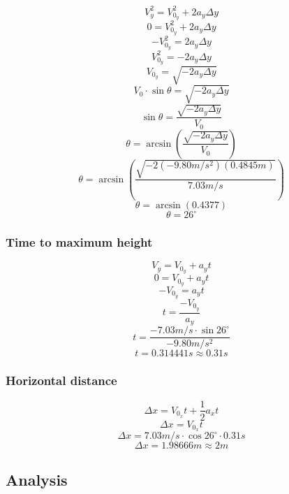\documentclass[11pt, letterpaper, includehead]{article}
\begin{document}
$$V_y^2 = V_{0_y}^2 + 2a_y\Delta y$$
$$0 = V_{0_y}^2 + 2a_y\Delta y$$
$$-V_{0_y}^2 = 2a_y\Delta y$$
$$V_{0_y}^2 = -2a_y\Delta y$$
$$V_{0_y} = \sqrt{-2a_y\Delta y}$$
$$V_0\cdot\sin\theta = \sqrt{-2a_y\Delta y}$$
$$\sin\theta = \frac{\sqrt{-2a_y\Delta y}}{V_0}$$
$$\theta = \arcsin\left(\frac{\sqrt{-2a_y\Delta y}}{V_0}\right)$$
$$\theta = \arcsin\left(\frac{\sqrt{-2(-9.80m/s^2)(0.4845m)}}{7.03m/s}\right)$$
$$\theta = \arcsin(0.4377)$$
$$\theta = 26^{\circ}$$
\subsubsection{Time to maximum height} %
$$V_y = V_{0_y} + a_yt$$
$$0 = V_{0_y} + a_yt$$
$$-V_{0_y} = a_yt$$
$$t = \frac{-V_{0_y}}{a_y}$$
$$t = \frac{-7.03m/s\cdot\sin26^{\circ}}{-9.80m/s^2}$$
$$t = 0.314441s \approx 0.31s$$
\subsubsection{Horizontal distance} %
$$\Delta x = V_{0_x}t + \frac{1}{2}a_xt$$
$$\Delta x = V_{0_x}t$$
$$\Delta x = 7.03m/s\cdot \cos26^{\circ}\cdot 0.31s$$
$$\Delta x = 1.98666m \approx 2m$$
\subsection{Analysis}  %
\end{document}
